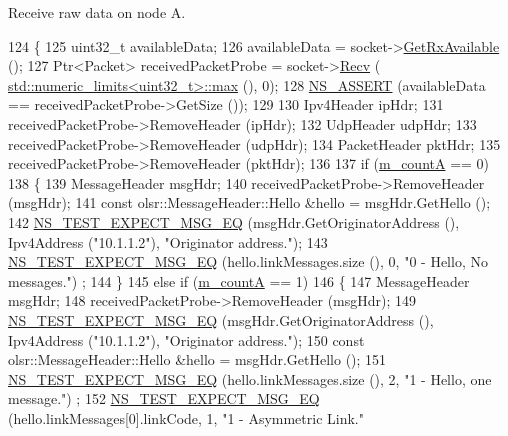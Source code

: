 Receive raw data on node A. 


\begin{DoxyCode}
124 \{
125   uint32\_t availableData;
126   availableData = socket->\hyperlink{classns3_1_1Socket_ad35d8931e53ae0754ee864acb1cecd0e}{GetRxAvailable} ();
127   Ptr<Packet> receivedPacketProbe = socket->\hyperlink{classns3_1_1Socket_a8949b1f844aae563446f2f4c5be8827a}{Recv} (
      \hyperlink{80211b_8c_affe776513b24d84b39af8ab0930fef7f}{std::numeric\_limits<uint32\_t>::max} (), 0);
128   \hyperlink{assert_8h_a6dccdb0de9b252f60088ce281c49d052}{NS\_ASSERT} (availableData == receivedPacketProbe->GetSize ());
129 
130   Ipv4Header ipHdr;
131   receivedPacketProbe->RemoveHeader (ipHdr);
132   UdpHeader udpHdr;
133   receivedPacketProbe->RemoveHeader (udpHdr);
134   PacketHeader pktHdr;
135   receivedPacketProbe->RemoveHeader (pktHdr);
136 
137   \textcolor{keywordflow}{if} (\hyperlink{classns3_1_1olsr_1_1TcRegressionTest_ad4df9f9a1950da47355d1623fb2a57ed}{m\_countA} == 0)
138     \{
139       MessageHeader msgHdr;
140       receivedPacketProbe->RemoveHeader (msgHdr);
141       \textcolor{keyword}{const} olsr::MessageHeader::Hello &hello = msgHdr.GetHello ();
142       \hyperlink{group__testing_ga7304ba46a28d8cf08dfdfd6499cf7068}{NS\_TEST\_EXPECT\_MSG\_EQ} (msgHdr.GetOriginatorAddress (), Ipv4Address (\textcolor{stringliteral}{"10.1.1.2"}),
       \textcolor{stringliteral}{"Originator address."});
143       \hyperlink{group__testing_ga7304ba46a28d8cf08dfdfd6499cf7068}{NS\_TEST\_EXPECT\_MSG\_EQ} (hello.linkMessages.size (), 0, \textcolor{stringliteral}{"0 - Hello, No messages."})
      ;
144     \}
145   \textcolor{keywordflow}{else} \textcolor{keywordflow}{if} (\hyperlink{classns3_1_1olsr_1_1TcRegressionTest_ad4df9f9a1950da47355d1623fb2a57ed}{m\_countA} == 1)
146     \{
147       MessageHeader msgHdr;
148       receivedPacketProbe->RemoveHeader (msgHdr);
149       \hyperlink{group__testing_ga7304ba46a28d8cf08dfdfd6499cf7068}{NS\_TEST\_EXPECT\_MSG\_EQ} (msgHdr.GetOriginatorAddress (), Ipv4Address (\textcolor{stringliteral}{"10.1.1.2"}),
       \textcolor{stringliteral}{"Originator address."});
150       \textcolor{keyword}{const} olsr::MessageHeader::Hello &hello = msgHdr.GetHello ();
151       \hyperlink{group__testing_ga7304ba46a28d8cf08dfdfd6499cf7068}{NS\_TEST\_EXPECT\_MSG\_EQ} (hello.linkMessages.size (), 2, \textcolor{stringliteral}{"1 - Hello, one message."})
      ;
152       \hyperlink{group__testing_ga7304ba46a28d8cf08dfdfd6499cf7068}{NS\_TEST\_EXPECT\_MSG\_EQ} (hello.linkMessages[0].linkCode, 1, \textcolor{stringliteral}{"1 - Asymmetric Link."}

\end{DoxyCode}
